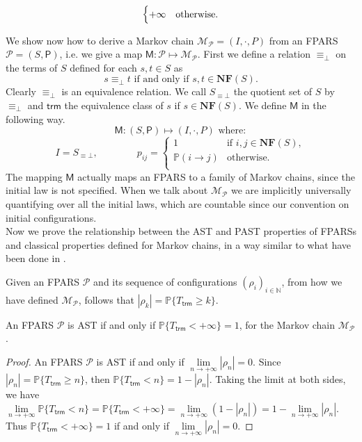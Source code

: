 \begin{LONG}
\begin{definition}
$$\begin{cases}
		+\infty & \textnormal{otherwise}.
		\end{cases}
		$$
	\end{definition}
	We show now how to derive a Markov chain $\mathcal{M_P}=(I,\cdot,P)$ from an FPARS $\mathcal{P}=(S,\mathsf{P})$, i.e. we give a map $\mathsf{M}:\mathcal{P}\longmapsto\mathcal{M_P}$. First we define a relation $\equiv_\bot$ on the terms of $S$ defined for each $s,t\in S$ as
	$$
	s\equiv_\bot t\text{ if and only if }s,t\in\mathbf{NF}(S).
	$$
	Clearly $\equiv_\bot$ is an equivalence relation. We call $S_{\equiv\bot}$ the quotient set of $S$ by $\equiv_\bot$ and $\mathsf{trm}$ the equivalence class of $s$ if $s\in\mathbf{NF}(S)$. We define $\mathsf{M}$ in the following way.
	$$
	\mathsf{M}:(S,\mathsf{P})\longmapsto(I,\cdot,P) \text{ where}:
	$$
	$$
	I=S_{\equiv\bot},\qquad\qquad
	p_{ij}=\begin{cases}
	1 & \text{if } i,j\in\mathbf{NF}(S),\\
	\mathbb{P}(i\rightarrow j) & \text{otherwise}.\\	
	\end{cases}	
	$$
	The mapping $\mathsf{M}$ actually maps an FPARS to a family of Markov chains, since the initial law is not specified. When we talk about $\mathcal{M_P}$ we are implicitly universally quantifying over all the initial laws, which are countable since our convention on initial configurations.\\
	Now we prove the relationship between the AST and PAST properties of FPARSs and classical properties defined for Markov chains, in a way similar to what have been done in \cite{bournez_proving_2005,ferrer_fioriti_probabilistic_2015}.
	\begin{remark}
		Given an FPARS $\mathcal{P}$ and its sequence of configurations $(\rho_i)_{i\in\mathbb{N}}$, from how we have defined $\mathcal{M_P}$, follows that $|\rho_k| = \mathbb{P}\{T_\mathsf{trm}\geq k\}$.
	\end{remark}
	\begin{proposition}
		An FPARS $\mathcal{P}$ is AST if and only if $\mathbb{P}\{T_{\mathsf{trm}}<+\infty\}=1$, for the Markov chain $\mathcal{M_P}$.
	\end{proposition}
	\begin{proof}
		An FPARS $\mathcal{P}$ is AST if and only if $\underset{n\rightarrow +\infty}{\lim}\left|\rho_{n}\right|=0$. Since $|\rho_n| = \mathbb{P}\{T_\mathsf{trm}\geq n\}$, then $\mathbb{P}\{T_\mathsf{trm}< n\}=1-|\rho_n|$. Taking the limit at both sides, we have $\underset{n\rightarrow +\infty}{\lim} \mathbb{P}\{T_\mathsf{trm}< n\} = \mathbb{P}\{T_\mathsf{trm}< +\infty\}= \underset{n\rightarrow +\infty}{\lim} (1-|\rho_n|)=1-\underset{n\rightarrow+\infty}{\lim} |\rho_n|$. Thus $\mathbb{P}\{T_\mathsf{trm}< +\infty\}=1$ if and only if $\underset{n\rightarrow+\infty}{\lim} |\rho_n|=0.$

\end{proof}
\end{LONG}
